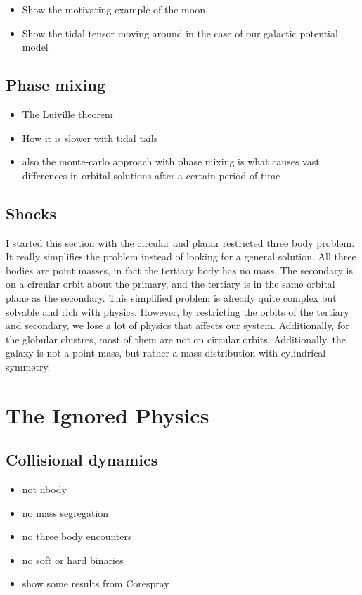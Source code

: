         \begin{itemize}
            \item Show the motivating example of the moon. 
            \item Show the tidal tensor moving around in the case of our galactic potential model 
        \end{itemize}


    \subsection{Phase mixing}
        \begin{itemize}
            \item The Luiville theorem
            \item How it is slower with tidal tails 
            \item also the monte-carlo approach with phase mixing is what causes vast differences in orbital solutions after a certain period of time 
        \end{itemize}
    
    \subsection{Shocks}
        I started this section with the circular and planar restricted three body problem. It really simplifies the problem instead of looking for a general solution. All three bodies are point masses, in fact the tertiary body has no mass. The secondary is on a circular orbit about the primary, and the tertiary is in the same orbital plane as the secondary. This simplified problem is already quite complex but solvable and rich with physics. However, by restricting the orbits of the tertiary and secondary, we lose a lot of physics that affects our system. Additionally, for the globular clustres, most of them are not on circular orbits. Additionally, the galaxy is not a point mass, but rather a mass distribution with cylindrical symmetry.        



\section{The Ignored Physics}
    \subsection{Collisional dynamics}
        \begin{itemize}
            \item not nbody
            \item no mass segregation
            \item no three body encounters 
            \item no soft or hard binaries 
            \item show some results from Corespray 
        \end{itemize}
    
